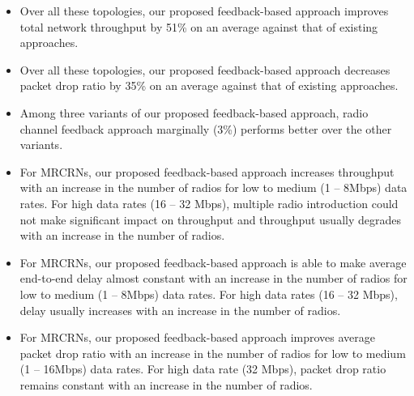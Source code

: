 \begin{itemize}
    \item Over all these topologies, our proposed feedback-based approach improves total network throughput by 51\% on an average against that of existing approaches.
    \item Over all these topologies, our proposed feedback-based approach decreases packet drop ratio by 35\% on an average against that of existing approaches.
    \item Among three variants of our proposed feedback-based approach, radio channel feedback approach marginally (3\%) performs better over the other variants.
    \item For MRCRNs, our proposed feedback-based approach increases throughput with an increase in the number of radios for low to medium (1 -- 8Mbps) data rates. For high data rates (16 -- 32 Mbps), multiple radio introduction could not make significant impact on throughput and throughput usually degrades with an increase in the number of radios.
    \item For MRCRNs, our proposed feedback-based approach is able to make average end-to-end delay almost constant with an increase in the number of radios for low to medium (1 -- 8Mbps) data rates. For high data rates (16 -- 32 Mbps), delay usually increases with an increase in the number of radios.
    \item For MRCRNs, our proposed feedback-based approach improves average packet drop ratio with an increase in the number of radios for low to medium (1 -- 16Mbps) data rates. For high data rate (32 Mbps), packet drop ratio remains constant with an increase in the number of radios.
\end{itemize}

\endinput

